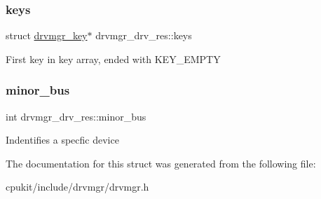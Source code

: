 \subsubsection{\texorpdfstring{keys}{keys}}
{\footnotesize\ttfamily struct \mbox{\hyperlink{structdrvmgr__key}{drvmgr\+\_\+key}}$\ast$ drvmgr\+\_\+drv\+\_\+res\+::keys}

First key in key array, ended with K\+E\+Y\+\_\+\+E\+M\+P\+TY \mbox{\label{structdrvmgr__drv__res_a55ee0835a6a4b9e8f9719f3c6c0387b7}} 
\subsubsection{\texorpdfstring{minor\_bus}{minor\_bus}}
{\footnotesize\ttfamily int drvmgr\+\_\+drv\+\_\+res\+::minor\+\_\+bus}

Indentifies a specfic device 

The documentation for this struct was generated from the following file\+:\begin{DoxyCompactItemize}
\item 
cpukit/include/drvmgr/drvmgr.\+h\end{DoxyCompactItemize}
